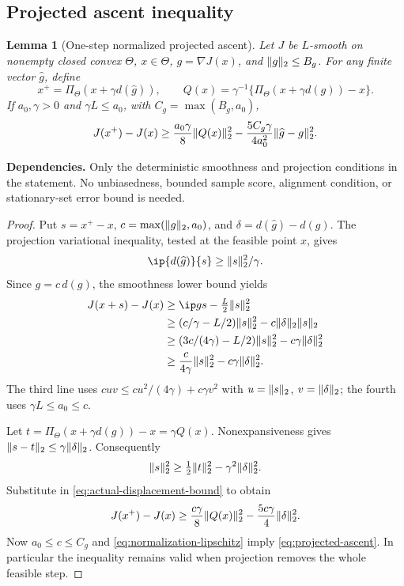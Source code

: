 \documentclass[11pt]{article}
\newtheorem{lemma}[theorem]{Lemma}
\newcommand{\1}{\mathbf 1}
\DeclarePairedDelimiter{\norm}{\lVert}{\rVert}
\theoremstyle{definition}
\newcommand{\dependson}[1]{\par\noindent\textbf{Dependencies.} #1\par\smallskip}
\begin{document}
\subsection{Projected ascent inequality}
\begin{lemma}[One-step normalized projected ascent]\label{lem:projected-ascent}
Let $J$ be $L$-smooth on nonempty closed convex $\Theta$, $x\in\Theta$, $g=\nabla J(x)$, and $\norm g_2\le B_g$. For any finite vector $\widehat g$, define
\[
 x^+=\Pi_\Theta(x+\gamma d(\widehat g)),\qquad
 Q(x)=\gamma^{-1}\{\Pi_\Theta(x+\gamma d(g))-x\}.
\]
If $a_0,\gamma>0$ and $\gamma L\le a_0$, with $C_g=\max(B_g,a_0)$,
\begin{equation}\label{eq:projected-ascent}
 J(x^+)-J(x)
 \ge\frac{a_0\gamma}{8}\norm{Q(x)}_2^2
 -\frac{5C_g\gamma}{4a_0^2}\norm{\widehat g-g}_2^2.
\end{equation}
\end{lemma}
\dependson{Only the deterministic smoothness and projection conditions in the statement. No unbiasedness, bounded sample score, alignment condition, or stationary-set error bound is needed.}
\begin{proof}
Put $s=x^+-x$, $c=\max(\norm g_2,a_0)$, and $\delta=d(\widehat g)-d(g)$. The projection variational inequality, tested at the feasible point $x$, gives
\[
 \ip{d(\widehat g)}{s}\ge\norm s_2^2/\gamma.
\]
Since $g=c\,d(g)$, the smoothness lower bound yields
\begin{align}
 J(x+s)-J(x)
 &\ge\ip g s-\tfrac L2\norm s_2^2\notag\\
 &\ge(c/\gamma-L/2)\norm s_2^2-c\norm\delta_2\norm s_2\notag\\
 &\ge(3c/(4\gamma)-L/2)\norm s_2^2-c\gamma\norm\delta_2^2\notag\\
 &\ge\frac{c}{4\gamma}\norm s_2^2-c\gamma\norm\delta_2^2.
 \label{eq:actual-displacement-bound}
\end{align}
The third line uses $cuv\le c u^2/(4\gamma)+c\gamma v^2$ with $u=\norm s_2$, $v=\norm\delta_2$; the fourth uses $\gamma L\le a_0\le c$.

Let $t=\Pi_\Theta(x+\gamma d(g))-x=\gamma Q(x)$. Nonexpansiveness gives $\norm{s-t}_2\le\gamma\norm\delta_2$. Consequently
\[
 \norm s_2^2\ge\tfrac12\norm t_2^2-\gamma^2\norm\delta_2^2.
\]
Substitute in \eqref{eq:actual-displacement-bound} to obtain
\[
 J(x^+)-J(x)\ge\frac{c\gamma}{8}\norm{Q(x)}_2^2
 -\frac{5c\gamma}{4}\norm\delta_2^2.
\]
Now $a_0\le c\le C_g$ and \eqref{eq:normalization-lipschitz} imply \eqref{eq:projected-ascent}. In particular the inequality remains valid when projection removes the whole feasible step.
\end{proof}
\end{document}
